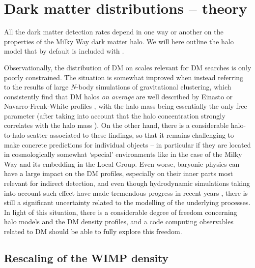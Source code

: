 
\section{Dark matter distributions -- theory}
\label{sec:halo}

All the dark matter detection rates depend in one way or another on
the properties of the Milky Way dark matter halo. We will here outline
the halo model that by default is included with \ds.

Observationally, the distribution of DM on scales relevant for DM searches is only poorly constrained. 
The situation is somewhat improved when instead referring to the results of large $N$-body simulations 
of gravitational clustering, which consistently find that DM halos {\it on average} are well described
by Einasto \cite{1965TrAlm...5...87E} or Navarro-Frenk-White profiles \cite{Navarro:1995iw}, with
the halo mass being essentially the only free parameter (after taking into account that the halo 
concentration strongly correlates with the halo mass \cite{Maccio:2008pcd}). On the other hand, there is 
a considerable halo-to-halo scatter associated to these findings, so that it remains challenging
to make concrete predictions for individual objects -- in particular if they are located in 
cosmologically somewhat `special' environments like in the case of the Milky Way and its
embedding in the Local Group. Even worse,
baryonic physics can have a large impact on the DM profiles, especially on their inner parts 
most relevant for indirect detection, and even though hydrodynamic simulations taking into
account such effect have made tremendous progress in recent 
years \cite{Schaye:2014tpa, Schaller:2014uwa, Wang:2015jpa, Tollet:2015gqa}, there is 
still a significant uncertainty related to the modelling of the underlying processes.
In light of this situation, there is a considerable degree of freedom concerning halo models
and the DM density profiles, and a code computing observables related to DM should be
able to fully explore this freedom. 


\subsection{Rescaling of the WIMP density}
\label{sec:rescale}


